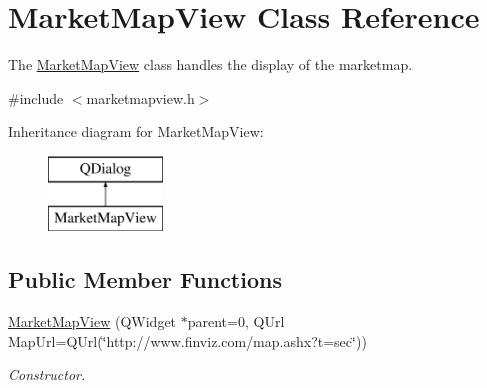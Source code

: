 \hypertarget{class_market_map_view}{\section{Market\+Map\+View Class Reference}
\label{class_market_map_view}
}


The \hyperlink{class_market_map_view}{Market\+Map\+View} class handles the display of the marketmap.  




{\ttfamily \#include $<$marketmapview.\+h$>$}

Inheritance diagram for Market\+Map\+View\+:\begin{figure}[H]
\begin{center}
\leavevmode
\includegraphics[height=2.000000cm]{class_market_map_view}
\end{center}
\end{figure}
\subsection*{Public Member Functions}
\begin{DoxyCompactItemize}
\item 
\hyperlink{class_market_map_view_ad68b944d6f3ef350a1d6925b2f974a90}{Market\+Map\+View} (Q\+Widget $\ast$parent=0, Q\+Url Map\+Url=Q\+Url(\char`\"{}http\+://www.\+finviz.\+com/map.\+ashx?t=sec\char`\"{}))
\begin{DoxyCompactList}\small\item\em Constructor. \end{DoxyCompactList}\end{DoxyCompactItemize}
